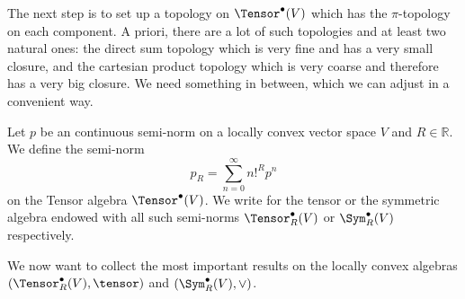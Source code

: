 The next step is to set up a topology on $\Tensor^{\bullet}(V)$ which 
has the $\pi$-topology on each component. A priori, there are a lot of such 
topologies and at least two natural ones: the direct sum topology which is 
very fine and has a very small closure, and the cartesian product topology 
which is very coarse and therefore has a very big closure. We need something 
in between, which we can adjust in a convenient way.
\begin{definition}[R-topology]
	Let $p$ be an continuous semi-norm on a locally convex vector space 
	$V$ and $R \in \mathbb{R}$. We define the semi-norm
	\begin{equation*}
		p_R 
		= 
		\sum\limits_{n=0}^{\infty}
		n!^R p^n
	\end{equation*}
	on the Tensor algebra $\Tensor^{\bullet}(V)$. We write for 
	the tensor or the symmetric algebra endowed with all such semi-norms  
	$\Tensor_R^{\bullet}(V)$ or $\Sym_R^{\bullet}(V)$ respectively.
\end{definition}
We now want to collect the most important results on the locally convex 
algebras $\left( \Tensor_R^{\bullet}(V), \tensor \right)$ and $\left( 
\Sym_R^{\bullet}(V), \vee \right)$. 
